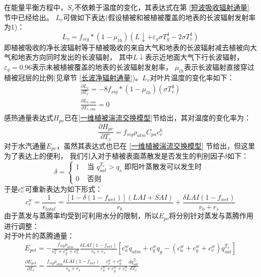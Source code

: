 在能量平衡方程中，$S_v$不依赖于温度的变化，其表达式在第 \ref{短波吸收辐射通量} 节中已经给出。
$L_v$可做如下表达(假设植被和被植被覆盖的地表的长波辐射发射率为1)：
\begin{equation}
L_{v}=f_{sig} *\left(1-\mu_{t h}\right)\left(L \downarrow+\varepsilon_{g} \sigma T_{g}^{4}-2 \sigma T_{v}^{4}\right)
\end{equation}
即植被吸收的净长波辐射等于植被吸收的来自大气和地表的长波辐射减去植被向大气和地表方向同时发出的长波辐射，
其中$L\downarrow$表示近地面大气下行长波辐射，$\varepsilon_g=0.96$表示未被植被覆盖的地表的长波辐射发射率，
$\mu_{th}$表示长波辐射直接穿过植被冠层的比例(见章节 \ref{长波净辐射通量})。$L_v$对叶片温度的变化率如下：
\begin{equation}
\begin{array}{c}\frac{\partial L_{v}}{\partial T_{v}}=-8 f_{sig} *\left(1-\mu_{t h}\right)\left(\sigma T_{v}^{3}\right) \\ \frac{\partial L_{v, s u n}}{\partial T_{v, s h a}}=0\end{array}
\end{equation}
感热通量表达式$H_{pv}$已在\ref{一维植被湍流交换模型}节给出，其对温度的变化率为：
\begin{equation}
\frac{\partial H_{p v}}{\partial T_{v}}=f_{sig} \rho_{atm} C_{pa} c_{v}^{h}
\end{equation}
对于水汽通量$E_{pv}$，虽然其表达式也已在 \ref{一维植被湍流交换模型} 节给出，但这里为了表达上的便利，
我们引入对于植被表面蒸散发是否发生的判别因子$\delta$如下：
\begin{equation}
\delta=\left\{\begin{array}{cc}1 & \text { 当 } q_{s a t}^{T_{v}}>q_{s} \text { 即阳叶蒸散发可以发生时 } \\ 0 & \text { 否则 }\end{array}\right.
\end{equation}
于是$c_v^w$可重新表达为如下形式：
\begin{equation}
c_{v}^{w}=\frac{1}{r_{total}}=\frac{\left[1-\delta\left(1-f_{wet}\right)\right](LAI+SAI)}{r_{b}}+\frac{\delta LAI\left(1-f_{wet}\right)}{r_{b}+r_{s}}
\end{equation}
由于蒸发与蒸腾率均受到可利用水分的限制，所以$E_{pv}$将分别针对蒸发与蒸腾作用进行调整：\\
对于叶片的蒸腾通量：
\begin{equation}
\begin{array}{c}E_{pvt}=-\frac{f_{sig} \rho_{atm}}{c_{a}^{w}+c_{g}^{w}+c_{v}^{w}} \frac{\delta LAI\left(1-f_{w e t}\right)}{r_{b}+r_{s}}\left[c_{a}^{w} q_{atm}+c_{g}^{w} q_{g}-\left(c_{a}^{w}+c_{g}^{w}+c_{v}^{w}\right) q_{s a t}^{T_{v}}\right] \\ \frac{\partial E_{pvt}}{\partial T_{v}}=\frac{f_{sig} \rho_{atm} \delta LAI\left(1-f_{w e t}\right)}{r_{b}+r_{s}} \frac{c_{a}^{w}+c_{g}^{w}}{c_{a}^{w}+c_{g}^{w}+c_{v}^{w}} \frac{d q_{s a t}^{T_{v}}}{d T_{v}}\end{array}
\end{equation}
